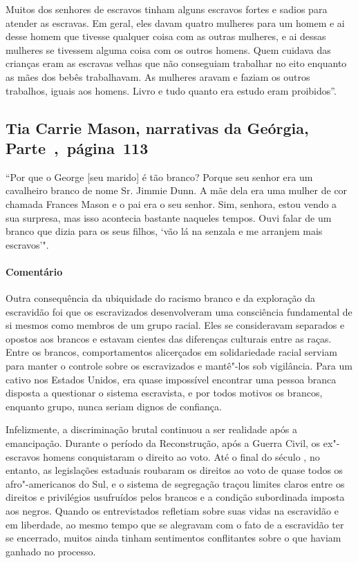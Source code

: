 Muitos dos senhores de escravos tinham alguns escravos fortes e sadios
para atender as escravas. Em geral, eles davam quatro mulheres para um
homem e ai desse homem que tivesse qualquer coisa com as outras
mulheres, e ai dessas mulheres se tivessem alguma coisa com os outros
homens. Quem cuidava das crianças eram as escravas velhas que não
conseguiam trabalhar no eito enquanto as mães dos bebês trabalhavam. As
mulheres aravam e faziam os outros trabalhos, iguais aos homens. Livro e
tudo quanto era estudo eram proibidos''.

\subsection{Tia Carrie Mason, narrativas da Geórgia, Parte~,~página~113}
\label{ref183}

``Por que o George {[}seu marido{]} é tão branco? Porque seu senhor era
um cavalheiro branco de nome Sr. Jimmie Dunn. A mãe dela era uma mulher
de cor chamada Frances Mason e o pai era o seu senhor. Sim, senhora,
estou vendo a sua surpresa, mas isso acontecia bastante naqueles tempos.
Ouvi falar de um branco que dizia para os seus filhos, `vão lá na
senzala e me arranjem mais escravos'".

\paragraph{Comentário}\quad
{\small
Outra consequência da ubiquidade do racismo branco e da exploração
da escravidão foi que os escravizados desenvolveram uma consciência
fundamental de si mesmos como membros de um grupo racial. Eles se
consideravam separados e opostos aos brancos e estavam cientes das
diferenças culturais entre as raças. Entre os brancos, comportamentos
alicerçados em solidariedade racial serviam para manter o controle sobre
os escravizados e mantê"-los sob vigilância. Para um cativo nos Estados
Unidos, era quase impossível encontrar uma pessoa branca disposta a
questionar o sistema escravista, e por todos motivos os brancos,
enquanto grupo, nunca seriam dignos de confiança.

Infelizmente, a discriminação brutal continuou a ser realidade
após a emancipação. Durante o período da
Reconstrução, após a Guerra Civil, os ex"-escravos homens conquistaram o
direito ao voto. Até o final do século , no entanto, as legislações
estaduais roubaram os direitos ao voto de quase todos os afro"-americanos
do Sul, e o sistema de segregação traçou limites claros entre os
direitos e privilégios usufruídos pelos brancos e a condição subordinada
imposta aos negros. Quando os entrevistados refletiam sobre suas vidas na
escravidão e em liberdade, ao mesmo tempo que se alegravam com o fato de
a escravidão ter se encerrado, muitos ainda tinham sentimentos
conflitantes sobre o que haviam ganhado no processo.
}

